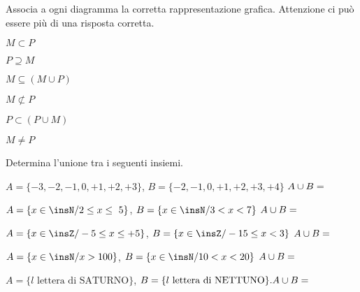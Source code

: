 \begin{esercizio}
\label{ese:7.44}
Associa a ogni diagramma la corretta rappresentazione grafica. Attenzione ci può 
essere più di una risposta corretta.
\begin{multicols}{2}
\begin{enumeratea}
 \item \(M\subset P\) \hfill\boxA\quad\boxB\quad\boxC\quad\boxD\quad\boxE
\item \(P\supseteq M\) \hfill\boxA\quad\boxB\quad\boxC\quad\boxD\quad\boxE
\item \(M\subseteq (M\cup P)\) \hfill\boxA\quad\boxB\quad\boxC\quad\boxD\quad\boxE
\item \(M\not\subset P\) \hfill\boxA\quad\boxB\quad\boxC\quad\boxD\quad\boxE
\item \(P\subset (P\cup M)\) \hfill\boxA\quad\boxB\quad\boxC\quad\boxD\quad\boxE
\item \(M\neq P\) \hfill\boxA\quad\boxB\quad\boxC\quad\boxD\quad\boxE
\end{enumeratea}
\end{multicols}
\begin{center}

\end{center}
\end{esercizio}

\begin{esercizio}
\label{ese:7.45}
Determina l'unione tra i seguenti insiemi.

\begin{enumeratea}
 \item \(A=\{-3,-2,-1,0,+1,+2,+3\}\), \(B=\{-2,-1,0,+1,+2,+3,+4\}\) \(A\cup 
B=\dotfill\)
 \item \(A=\{x\in\insN/2\le x\le~5\}\), \(B=\{x\in\insN/3<x<7\}\) \(A\cup B=\dotfill\)
 \item \(A=\{x\in\insZ/-5\le x\le +5\}\), \(B=\{x\in\insZ/-15\le x<3\}\) \(A\cup 
B=\dotfill\)
 \item \(A=\{x\in\insN/x>100\}\), \(B=\{x\in \insN/10<x<20\}\) \(A\cup B=\dotfill\)
 \item \(A=\{l\text{ lettera di SATURNO}\}\), \(B=\{l\text{ lettera di NETTUNO}\}. 
A\cup B=\dotfill\)
\end{enumeratea}
\end{esercizio}

